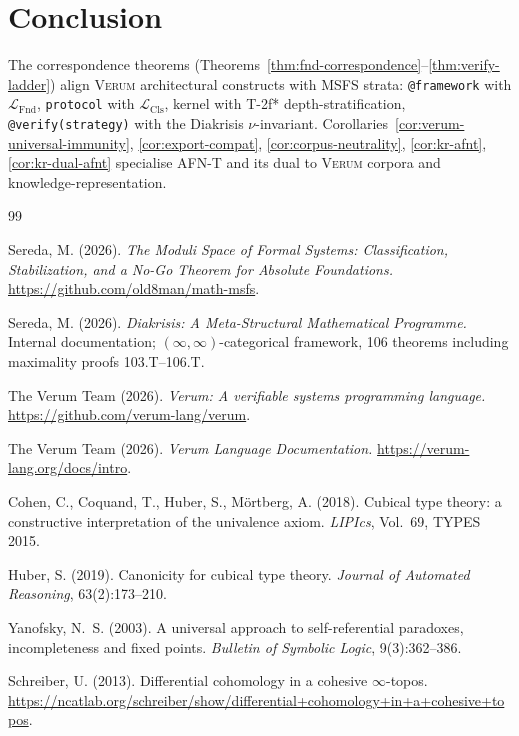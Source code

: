 \documentclass[11pt, a4paper]{article}
\theoremstyle{definition}
\theoremstyle{remark}
\newcommand{\LFnd}{\mathcal{L}_{\mathrm{Fnd}}}
\newcommand{\LCls}{\mathcal{L}_{\mathrm{Cls}}}
\newcommand{\Verum}{\textsc{Verum}}
\begin{document}
\section{Conclusion}
\label{sec:conclusion}

The correspondence theorems (Theorems~\ref{thm:fnd-correspondence}--\ref{thm:verify-ladder}) align \Verum{} architectural constructs with MSFS strata: \texttt{@framework} with $\LFnd$, \texttt{protocol} with $\LCls$, kernel with T-2f* depth-stratification, \texttt{@verify(strategy)} with the Diakrisis $\nu$-invariant. Corollaries~\ref{cor:verum-universal-immunity}, \ref{cor:export-compat}, \ref{cor:corpus-neutrality}, \ref{cor:kr-afnt}, \ref{cor:kr-dual-afnt} specialise AFN-T and its dual to \Verum{} corpora and knowledge-representation.

\begin{thebibliography}{99}

Sereda, M. (2026).
\newblock \emph{The Moduli Space of Formal Systems: Classification, Stabilization, and a No-Go Theorem for Absolute Foundations.}
\newblock \url{https://github.com/old8man/math-msfs}.

Sereda, M. (2026).
\newblock \emph{Diakrisis: A Meta-Structural Mathematical Programme.}
\newblock Internal documentation; $(\infty, \infty)$-categorical framework, 106 theorems including maximality proofs 103.T--106.T.

The Verum Team (2026).
\newblock \emph{Verum: A verifiable systems programming language.}
\newblock \url{https://github.com/verum-lang/verum}.

The Verum Team (2026).
\newblock \emph{Verum Language Documentation.}
\newblock \url{https://verum-lang.org/docs/intro}.

Cohen, C., Coquand, T., Huber, S., M\"ortberg, A. (2018).
\newblock Cubical type theory: a constructive interpretation of the univalence axiom.
\newblock \emph{LIPIcs}, Vol.~69, TYPES 2015.

Huber, S. (2019).
\newblock Canonicity for cubical type theory.
\newblock \emph{Journal of Automated Reasoning}, 63(2):173--210.

Yanofsky, N.~S. (2003).
\newblock A universal approach to self-referential paradoxes, incompleteness and fixed points.
\newblock \emph{Bulletin of Symbolic Logic}, 9(3):362--386.

Schreiber, U. (2013).
\newblock Differential cohomology in a cohesive $\infty$-topos.
\newblock \url{https://ncatlab.org/schreiber/show/differential+cohomology+in+a+cohesive+topos}.


\end{thebibliography}
\end{document}
